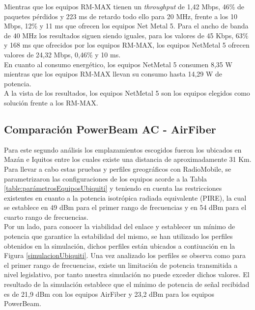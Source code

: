 Mientras que los equipos RM-MAX tienen un \textit{throughput} de 1,42 Mbps, 46\% de paquetes pérdidos y 223 ms de retardo todo ello para 20 MHz, frente a los 10 Mbps, 12\% y 11 ms que ofrecen los equipos Net Metal 5. Para el ancho de banda de 40 MHz los resultados siguen siendo iguales, para los valores de 45 Kbps, 63\% y 168 ms que ofrecidos por los equipos RM-MAX, los equipos NetMetal 5 ofrecen valores de 24,32 Mbps, 0,46\% y 10 ms.\\

En cuanto al consumo energético, los equipos NetMetal 5 consumen 8,35 W mientras que los equipos RM-MAX llevan su consumo hasta 14,29 W de potencia.\\

A la vista de los resultados, los equipos NetMetal 5 son los equipos elegidos como solución frente a los RM-MAX. 

\subsection{Comparación PowerBeam AC - AirFiber }
Para este segundo análisis los emplazamientos escogidos fueron los ubicados en Mazán e Iquitos entre los cuales existe una distancia de aproximadamente 31 Km. Para llevar a cabo estas pruebas y perfiles greográficos con RadioMobile, se parametrizaron las configuraciones de los equipos acorde a la Tabla \ref{table:parámetrosEquiposUbiquiti} y teniendo en cuenta las restricciones existentes en cuanto a la potencia isotrópica radiada equivalente (PIRE), la cual se establece en 49 dBm para el primer rango de frecuencias y en 54 dBm para el cuarto rango de frecuencias.\\

Por un lado, para conocer la viabilidad del enlace y establecer un mínimo de potencia que garantice la estabilidad del mismo, se han utilizado los perfiles obtenidos en la simulación, dichos perfiles están ubicados a contiuación en la Figura \ref{simulacionUbiquiti}. Una vez analizado los perfiles se observa como para el primer rango de frecuencias, existe un limitación de potencia transmitida a nivel legislativo, por tanto nuestra simulación no puede exceder dichos valores. El resultado de la simulación establece que el mínimo de potencia de señal recibidad es de 21,9 dBm con los equipos AirFiber y 23,2 dBm para los equipos PowerBeam.

